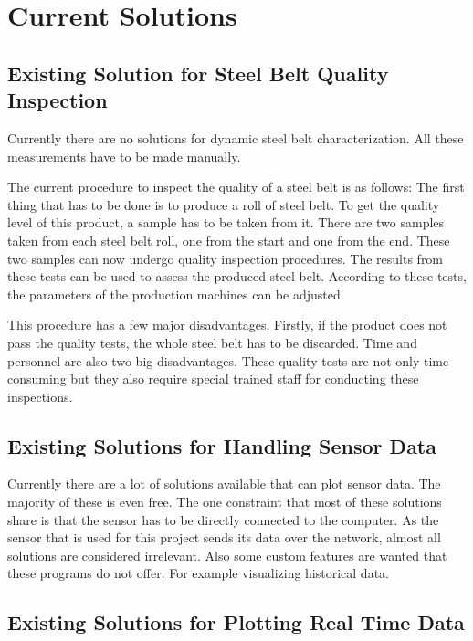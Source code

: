 \section{Current Solutions}

\subsection{Existing Solution for Steel Belt Quality Inspection}

Currently there are no solutions for dynamic steel belt characterization. All these measurements have to be made manually.

The current procedure to inspect the quality of a steel belt is as follows: The first thing that has to be done is to produce a roll of steel belt. To get the quality level of this product, a sample has to be taken from it. There are two samples taken from each steel belt roll, one from the start and one from the end. These two samples can now undergo quality inspection procedures. The results from these tests can be used to assess the produced steel belt. According to these tests, the parameters of the production machines can be adjusted.

This procedure has a few major disadvantages. Firstly, if the product does not pass the quality tests, the whole steel belt has to be discarded. Time and personnel are also two big disadvantages. These quality tests are not only time consuming but they also require special trained staff for conducting these inspections.

\subsection{Existing Solutions for Handling Sensor Data}

Currently there are a lot of solutions available that can plot sensor data. The majority of these is even free. The one constraint that most of these solutions share is that the sensor has to be directly connected to the computer. As the sensor that is used for this project sends its data over the network, almost all solutions are considered irrelevant. Also some custom features are wanted that these programs do not offer. For example visualizing historical data.

\subsection{Existing Solutions for Plotting Real Time Data}


